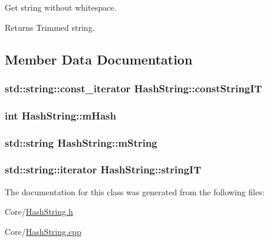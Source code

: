 Get string without whitespace. 

\begin{DoxyReturn}{Returns}
Trimmed string. 
\end{DoxyReturn}


\subsection{Member Data Documentation}
\subsubsection[{\texorpdfstring{const\+String\+IT}{constStringIT}}]{\setlength{\rightskip}{0pt plus 5cm}std\+::string\+::const\+\_\+iterator Hash\+String\+::const\+String\+IT\hspace{0.3cm}{\ttfamily [private]}}\hypertarget{classHashString_aaac4c409194357a6c87e9b3bab96468b}{}\label{classHashString_aaac4c409194357a6c87e9b3bab96468b}
\subsubsection[{\texorpdfstring{m\+Hash}{mHash}}]{\setlength{\rightskip}{0pt plus 5cm}int Hash\+String\+::m\+Hash\hspace{0.3cm}{\ttfamily [private]}}\hypertarget{classHashString_a4f984cd8b80701eb7a44a0f32759aa3b}{}\label{classHashString_a4f984cd8b80701eb7a44a0f32759aa3b}
\subsubsection[{\texorpdfstring{m\+String}{mString}}]{\setlength{\rightskip}{0pt plus 5cm}std\+::string Hash\+String\+::m\+String\hspace{0.3cm}{\ttfamily [private]}}\hypertarget{classHashString_a0465426e5a795126788f28de1464917a}{}\label{classHashString_a0465426e5a795126788f28de1464917a}
\subsubsection[{\texorpdfstring{string\+IT}{stringIT}}]{\setlength{\rightskip}{0pt plus 5cm}std\+::string\+::iterator Hash\+String\+::string\+IT\hspace{0.3cm}{\ttfamily [private]}}\hypertarget{classHashString_a24c3a3c5d1b20711aea59d340d3b9b77}{}\label{classHashString_a24c3a3c5d1b20711aea59d340d3b9b77}


The documentation for this class was generated from the following files\+:\begin{DoxyCompactItemize}
\item 
Core/\hyperlink{HashString_8h}{Hash\+String.\+h}\item 
Core/\hyperlink{HashString_8cpp}{Hash\+String.\+cpp}\end{DoxyCompactItemize}

